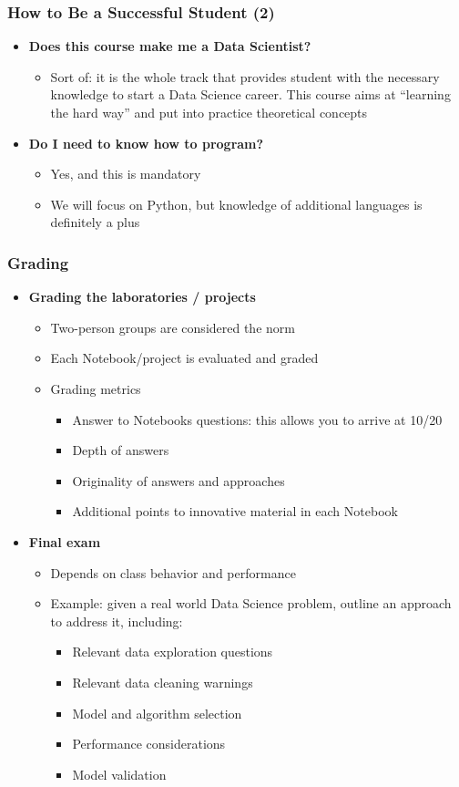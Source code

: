 \begin{frame}\frametitle{How to Be a Successful Student (2)}
\begin{itemize}
	\item {\bf Does this course make me a Data Scientist?}
	\begin{itemize}
		\item Sort of: it is the whole track that provides student with the necessary knowledge to start a Data Science career. This course aims at ``learning the hard way'' and put into practice theoretical concepts
	\end{itemize}
	\item {\bf Do I need to know how to program?}
	\begin{itemize}
		\item Yes, and this is mandatory
		\item We will focus on Python, but knowledge of additional languages is definitely a plus
	\end{itemize}
\end{itemize}
\end{frame}

\begin{frame}\frametitle{Grading}
\begin{itemize}
	\item {\bf Grading the laboratories / projects}
	\begin{itemize}
		\item Two-person groups are considered the norm
		\item Each Notebook/project is evaluated and graded
		\item Grading metrics
		\begin{itemize}
			\item Answer to Notebooks questions: this allows you to arrive at 10/20
			\item Depth of answers
			\item Originality of answers and approaches
			\item Additional points to innovative material in each Notebook
		\end{itemize}
	\end{itemize}
	\item {\bf Final exam}
	\begin{itemize}
		\item Depends on class behavior and performance
		\item Example: given a real world Data Science problem, outline an approach to address it, including:
		\begin{itemize}
			\item Relevant data exploration questions
			\item Relevant data cleaning warnings
			\item Model and algorithm selection
			\item Performance considerations
			\item Model validation
		\end{itemize}
	\end{itemize}
\end{itemize}
\end{frame}

